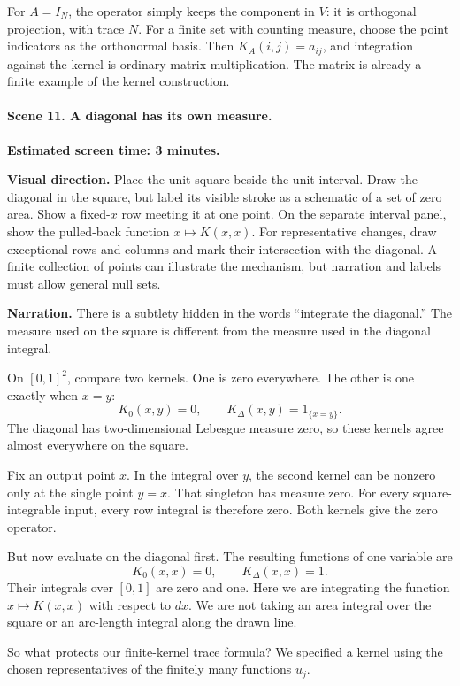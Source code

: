 For $A=I_N$, the operator simply keeps the component in $V$: it is orthogonal projection, with trace $N$. For a finite set with counting measure, choose the point indicators as the orthonormal basis. Then $K_A(i,j)=a_{ij}$, and integration against the kernel is ordinary matrix multiplication. The matrix is already a finite example of the kernel construction.

\paragraph{Scene 11. A diagonal has its own measure.}
\textbf{Estimated screen time: 3 minutes.}

\textbf{Visual direction.} Place the unit square beside the unit interval. Draw the diagonal in the square, but label its visible stroke as a schematic of a set of zero area. Show a fixed-$x$ row meeting it at one point. On the separate interval panel, show the pulled-back function $x\mapsto K(x,x)$. For representative changes, draw exceptional rows and columns and mark their intersection with the diagonal. A finite collection of points can illustrate the mechanism, but narration and labels must allow general null sets.

\textbf{Narration.} There is a subtlety hidden in the words ``integrate the diagonal.'' The measure used on the square is different from the measure used in the diagonal integral.

On $[0,1]^2$, compare two kernels. One is zero everywhere. The other is one exactly when $x=y$:
\[
K_0(x,y)=0,\qquad K_\Delta(x,y)=1_{\{x=y\}}.
\]
The diagonal has two-dimensional Lebesgue measure zero, so these kernels agree almost everywhere on the square.

Fix an output point $x$. In the integral over $y$, the second kernel can be nonzero only at the single point $y=x$. That singleton has measure zero. For every square-integrable input, every row integral is therefore zero. Both kernels give the zero operator.

But now evaluate on the diagonal first. The resulting functions of one variable are
\[
K_0(x,x)=0,\qquad K_\Delta(x,x)=1.
\]
Their integrals over $[0,1]$ are zero and one. Here we are integrating the function $x\mapsto K(x,x)$ with respect to $dx$. We are not taking an area integral over the square or an arc-length integral along the drawn line.

So what protects our finite-kernel trace formula? We specified a kernel using the chosen representatives of the finitely many functions $u_j$.

